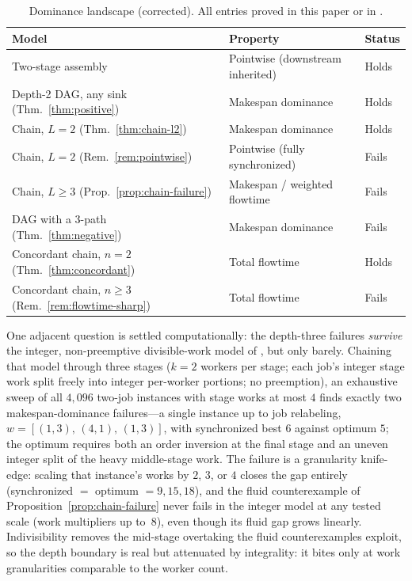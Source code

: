 \documentclass[sn-mathphys,NameDate]{sn-jnl}
\theoremstyle{thmstyleone}
\theoremstyle{thmstylethree}
\theoremstyle{thmstyletwo}
\begin{document}
\begin{table}[h]
\centering
\caption{Dominance landscape (corrected). All entries proved
in this paper or in \citet{bowmanA}.}
\label{tab:landscape}
\begin{tabular}{lll}
\toprule
\textbf{Model} & \textbf{Property} & \textbf{Status} \\
\midrule
Two-stage assembly \citep{bowmanA}
  & Pointwise (downstream inherited)
  & Holds \\
Depth-2 DAG, any sink (Thm.~\ref{thm:positive})
  & Makespan dominance
  & Holds \\
Chain, $L = 2$ (Thm.~\ref{thm:chain-l2})
  & Makespan dominance
  & Holds \\
Chain, $L = 2$ (Rem.~\ref{rem:pointwise})
  & Pointwise (fully synchronized)
  & Fails \\
Chain, $L \geq 3$ (Prop.~\ref{prop:chain-failure})
  & Makespan / weighted flowtime
  & Fails \\
DAG with a 3-path (Thm.~\ref{thm:negative})
  & Makespan dominance
  & Fails \\
Concordant chain, $n = 2$ (Thm.~\ref{thm:concordant})
  & Total flowtime
  & Holds \\
Concordant chain, $n \geq 3$ (Rem.~\ref{rem:flowtime-sharp})
  & Total flowtime
  & Fails \\
\bottomrule
\end{tabular}
\end{table}

One adjacent question is settled computationally: the
depth-three failures \emph{survive} the integer,
non-preemptive divisible-work model of \citet{bowmanA}, but
only barely. Chaining that model through three stages ($k = 2$
workers per stage; each job's integer stage work split freely
into integer per-worker portions; no preemption), an
exhaustive sweep of all $4{,}096$ two-job instances with stage
works at most $4$ finds exactly two makespan-dominance
failures---a single instance up to job relabeling,
$w = [(1,3),\,(4,1),\,(1,3)]$, with synchronized best $6$
against optimum $5$; the optimum requires both an order
inversion at the final stage and an uneven integer split of
the heavy middle-stage work. The failure is a granularity
knife-edge: scaling that instance's works by $2$, $3$, or $4$
closes the gap entirely (synchronized $=$ optimum
$= 9, 15, 18$), and the fluid counterexample of
Proposition~\ref{prop:chain-failure} never fails in the
integer model at any tested scale (work multipliers up
to~$8$), even though its fluid gap grows linearly.
Indivisibility removes the mid-stage overtaking the fluid
counterexamples exploit, so the depth boundary is real but
attenuated by integrality: it bites only at work
granularities comparable to the worker count.
\end{document}
